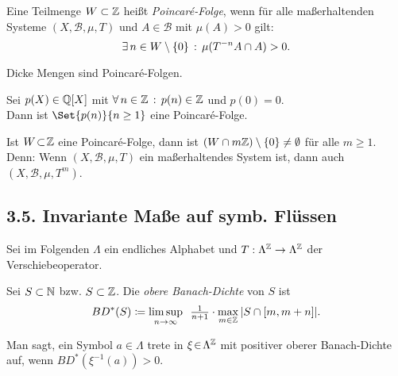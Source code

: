 \documentclass{cheat-sheet}
\newcommand{\Bor}{\mathcal{B}} %
\newcommand{\meST}{$(X, \Bor, \mu, T)$} %
\begin{document}
\begin{defn}
  Eine Teilmenge $W \subset \mathbb{Z}$ heißt \emph{Poincaré-Folge}, wenn für alle maßerhaltenden Systeme \meST{} und $A \in \Bor$ mit $\mu(A) > 0$ gilt:
  \[ \exists \, {n \in W \setminus \{ 0 \}} \,:\, \mu(T^{-n} A \cap A) > 0. \]
\end{defn}

\begin{bsp}
  Dicke Mengen sind Poincaré-Folgen.
\end{bsp}

\begin{thm}
  Sei $p(X) \in \mathbb{Q}[X]$ mit $\forall \, {n \in \mathbb{Z}} \,:\, p(n) \in \mathbb{Z}$ und $p(0) = 0$. \\
  Dann ist $\Set{p(n)}{n \geq 1}$ eine Poincaré-Folge.
\end{thm}

\begin{bem}
  Ist $W \!\subset\! \mathbb{Z}$ eine Poincaré-Folge, dann ist $(W \cap m \mathbb{Z}) \setminus \{ 0 \} \neq \emptyset$ für alle $m \geq 1$.
  Denn: Wenn \meST{} ein maßerhaltendes System ist, dann auch $(X, \Bor, \mu, T^m)$.
\end{bem}

\begin{samepage}
  \section{3.5. Invariante Maße auf symb. Flüssen}
\end{samepage}

\begin{bem}
  Sei im Folgenden $\Lambda$ ein endliches Alphabet und $T : \Lambda^{\mathbb{Z}} \to \Lambda^{\mathbb{Z}}$ der Verschiebeoperator.
\end{bem}

\begin{defn}
  Sei $S \subset \mathbb{N}$ bzw. $S \subset \mathbb{Z}$. Die \emph{obere Banach-Dichte} von $S$ ist
  \[ BD^*(S) \coloneqq \limsup_{n \to \infty} \enspace \tfrac{1}{n+1} \cdot \max_{m \in \mathbb{Z}} \, \lvert S \cap \left[ m, m+n \right]\rvert. \]
\end{defn}


\begin{defn}
  Man sagt, ein Symbol $a \in \Lambda$ trete in $\xi \!\in\! \Lambda^{\mathbb{Z}}$ mit positiver oberer Banach-Dichte auf, wenn $BD^*(\xi^{-1}(a)) > 0$.
\end{defn}
\end{document}
